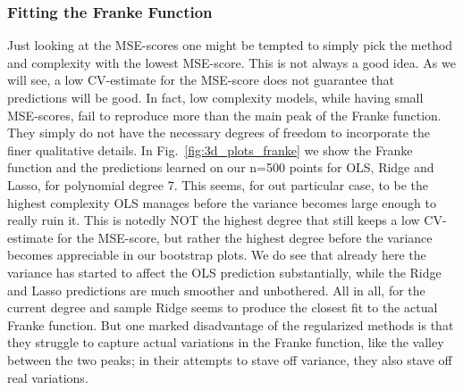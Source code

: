\documentclass[reprint, english, nofootinbib]{revtex4-2}
\begin{document}

\subsubsection{Fitting the Franke Function}


Just looking at the MSE-scores one might be tempted to simply pick the method and complexity with the lowest MSE-score. This is not always a good idea. As we will see, a low CV-estimate for the MSE-score does not guarantee that predictions will be good. In fact, low complexity models, while having small MSE-scores, fail to reproduce more than the main peak of the Franke function. They simply do not have the necessary degrees of freedom to incorporate the finer qualitative details. In Fig.~\ref{fig:3d_plots_franke} we show the Franke function and the predictions learned on our n=500 points for OLS, Ridge and Lasso, for polynomial degree 7. This seems, for out particular case, to be the highest complexity OLS manages before the variance becomes large enough to really ruin it. This is notedly NOT the highest degree that still keeps a low CV-estimate for the MSE-score, but rather the highest degree before the variance becomes appreciable in our bootstrap plots. We do see that already here the variance has started to affect the OLS prediction substantially, while the Ridge and Lasso predictions are much smoother and unbothered. All in all, for the current degree and sample Ridge seems to produce the closest fit to the actual Franke function. But one marked disadvantage of the regularized methods is that they struggle to capture actual variations in the Franke function, like the valley between the two peaks; in their attempts to stave off variance, they also stave off real variations.
\end{document}
